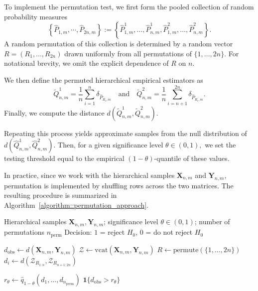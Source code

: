 To implement the permutation test, we first form the pooled collection of random probability measures
\[
\left\{ \widehat{P}_{1,m},\cdots, \widehat{P}_{2n,m}  \right\} :=\left\{ \widehat{P}^1_{1,m}, \dots, \widehat{P}^1_{n,m}, \widehat{P}^2_{1,m}, \dots, \widehat{P}^2_{n,m} \right\} .
\]
A random permutation of this collection is determined by a random vector $R = (R_1, \dots, R_{2n})$ drawn uniformly from all permutations of $\{1, \dots, 2n\}$. For notational brevity, we omit the explicit dependence of $R$ on $n$.

We then define the permuted hierarchical empirical estimators as
\begin{equation}\label{definition:permuted_hierarchical_estimators}
\widetilde{Q}^1_{n,m} = \frac{1}{n} \sum_{i = 1}^n \delta_{\widehat{P}_{R_i,m}} \quad \text{and} \quad \widetilde{Q}^2_{n,m} = \frac{1}{n} \sum_{i = n+1}^{2n} \delta_{\widehat{P}_{R_i,m}}.
\end{equation}
Finally, we compute the distance $d(\widetilde{Q}^1_{n,m}, \widetilde{Q}^2_{n,m}).$

Repeating this process yields approximate samples from the null distribution of $d(\widehat{Q}^1_{n,m}, \widehat{Q}^2_{n,m})$. Then, for a given significance level $\theta \in (0,1),$ we set the testing threshold equal to the empirical $(1-\theta)$-quantile of these values.

In practice, since we work with the hierarchical samples $\mathbf{X}_{n,m}$ and $\mathbf{Y}_{n,m}$, permutation is implemented by shuffling rows across the two matrices. The resulting procedure is summarized in Algorithm~\ref{algorithm::permutation_approach}.

\begin{center}
\begin{minipage}{0.85\textwidth} %
\begin{algorithm}[H]
\caption{Permutation test with $d \in \{\dlip,\WW\}$}
\label{algorithm::permutation_approach}
\begin{algorithmic}[1]
\Require Hierarchical samples $\mathbf{X}_{n,m},\mathbf{Y}_{n,m}$; significance level $\theta \in (0,1)$; number of permutations $n_\text{perm}$
\Ensure Decision: $1$ = reject $H_0$, $0$ = do not reject $H_0$

\State $d_{\mathrm{obs}} \gets d(\mathbf{X}_{n,m},\mathbf{Y}_{n,m})$ 
\State $\mathcal{Z} \gets \text{vcat}(\mathbf{X}_{n,m},\mathbf{Y}_{n,m})$ 
    \State $R \gets \text{permute}(\{1,\ldots,2n\})$
    \State $d_i \gets d(\mathcal{Z}_{R_{1:n}}, \mathcal{Z}_{R_{n+1:2n}})$
\EndFor

\State $r_\theta \gets \widehat{q}_{1-\theta}(d_1,\ldots,d_{n_\text{perm}})$ 
\State \Return $\mathbf{1}\{d_{\mathrm{obs}} > r_\theta\}$
\end{algorithmic}
\end{algorithm}
\end{minipage}
\end{center}


